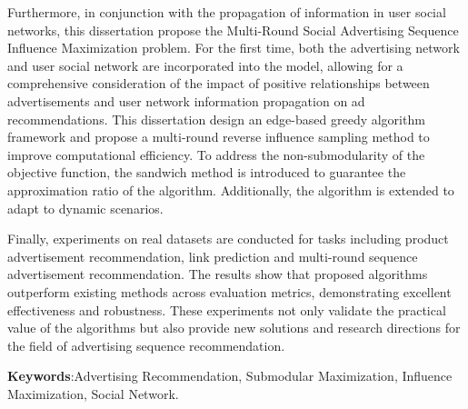 Furthermore, in conjunction with the propagation of information in user social networks, this dissertation propose the Multi-Round Social Advertising Sequence Influence Maximization problem. For the first time, both the advertising network and user social network are incorporated into the model, allowing for a comprehensive consideration of the impact of positive relationships between advertisements and user network information propagation on ad recommendations. This dissertation design an edge-based greedy algorithm framework and propose a multi-round reverse influence sampling method to improve computational efficiency. To address the non-submodularity of the objective function, the sandwich method is introduced to guarantee the approximation ratio of the algorithm. Additionally, the algorithm is extended to adapt to dynamic scenarios.

Finally, experiments on real datasets are conducted for tasks including product advertisement recommendation, link  prediction and multi-round sequence advertisement recommendation. The results show that proposed algorithms outperform existing methods across evaluation metrics, demonstrating excellent effectiveness and robustness. These experiments not only validate the practical value of the algorithms but also provide new solutions and research directions for the field of advertising sequence recommendation.

\textbf{Keywords}:Advertising Recommendation, Submodular Maximization, Influence Maximization, Social Network.